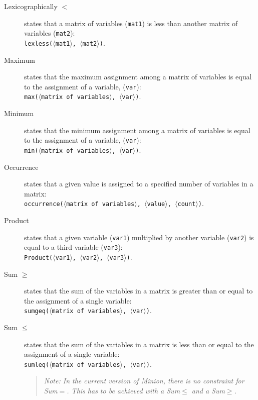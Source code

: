 \documentclass{article}
\begin{document}
\begin{small}
\begin{description}
\item[Lexicographically $\mathbf{<}$] states that a matrix of
variables (\texttt{mat1}) is less than another matrix of variables
(\texttt{mat2}):\\
\texttt{lexless($\langle$mat1$\rangle$, $\langle$mat2$\rangle$)}.

\item[Maximum] states that the maximum assignment among a matrix of
variables is equal to the assignment of a variable, (\texttt{var}):\\
\texttt{max($\langle$matrix of variables$\rangle$,
$\langle$var$\rangle$)}.

\item[Minimum] states that the minimum assignment among a matrix of
variables is equal to the assignment of a variable, (\texttt{var}):\\
\texttt{min($\langle$matrix of variables$\rangle$,
$\langle$var$\rangle$)}.

\item[Occurrence] states that a given value is assigned to a specified
number of variables in a matrix:\\ \texttt{occurrence($\langle$matrix
of variables$\rangle$, $\langle$value$\rangle$,
$\langle$count$\rangle$)}.

\item[Product] states that a given variable (\texttt{var1}) multiplied
by another variable (\texttt{var2}) is equal to a third variable
(\texttt{var3}):\\ \texttt{Product($\langle$var1$\rangle$,
$\langle$var2$\rangle$, $\langle$var3$\rangle$)}.

\item[Sum $\mathbf{\geq}$] states that the sum of the variables in a
matrix is greater than or equal to the assignment of a single
variable:\\ \texttt{sumgeq($\langle$matrix of variables$\rangle$,
$\langle$var$\rangle$)}.

\item[Sum $\mathbf{\leq}$] states that the sum of the variables in a
matrix is less than or equal to the assignment of a single variable:\\
\texttt{sumleq($\langle$matrix of variables$\rangle$,
$\langle$var$\rangle$)}.

\begin{quote}
{\em Note: In the current version of {\sc Minion}, there is no 
constraint for Sum$=$.  This has to be achieved with a 
Sum$\mathbf{\leq}$ and a 
Sum$\mathbf{\geq}$.}
\end{quote}


\end{description}
\end{small}
\end{document}
